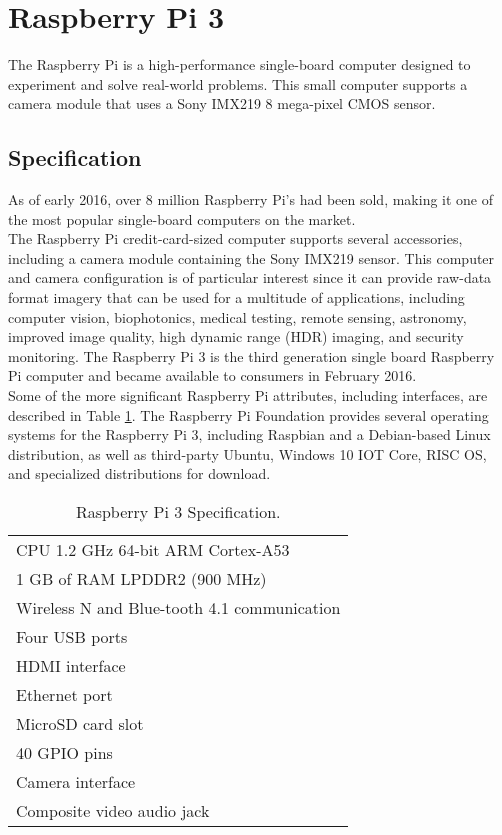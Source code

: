 \section{Raspberry Pi 3}
\label{sec:raspi3}
The Raspberry Pi is a high-performance single-board computer designed to
experiment and solve real-world problems. This small computer supports a camera
module that uses a Sony IMX219 8 mega-pixel CMOS sensor.
%
\subsection{Specification}
\label{ssec:raspispecification}
As of early 2016, over 8 million Raspberry Pi's had been sold, making it one of
the most popular single-board computers on the
market.\cite{upton2016raspberry}\\ The Raspberry Pi credit-card-sized computer
supports several accessories, including a camera module containing the Sony
IMX219 sensor. This computer and camera configuration is of particular interest
since it can provide raw-data format imagery that can be used for a multitude of
applications, including computer vision, biophotonics, medical testing, remote
sensing, astronomy, improved image quality, high dynamic range (HDR) imaging,
and security monitoring. The Raspberry Pi 3 is the third generation single board
Raspberry Pi computer and became available to consumers in February 2016. \\Some
of the more significant Raspberry Pi attributes, including interfaces, are
described in Table \ref{tab:rapberryattributes}. The Raspberry
Pi Foundation provides several operating systems for the  Raspberry Pi 3,
including Raspbian and a Debian-based Linux distribution, as  well as
third-party Ubuntu, Windows 10 IOT Core, RISC OS, and specialized  distributions
for download.\cite{10.1117/1.JEI.26.1.013014}
%
\begin{table}[htb]
\centering
	\caption{Raspberry Pi 3 Specification.}
	\label{tab:rapberryattributes}
	\begin{tabular}{l}
		\hline
		\rowcolor{aliceblue!85}CPU 1.2 \si{\giga\hertz} 64-bit ARM Cortex-A53 \\
		1 GB of RAM LPDDR2 (900 \si{\mega\hertz}) \\
		\rowcolor{aliceblue!85}Wireless N and Blue-tooth 4.1 communication\\
		Four USB ports\\
		\rowcolor{aliceblue!85}HDMI interface\\
		Ethernet port\\
		\rowcolor{aliceblue!85}MicroSD card slot\\
		40 GPIO pins\\
		\rowcolor{aliceblue!85}Camera interface\\
		Composite video audio jack\\
		\hline
\end{tabular}
\end{table}
%
